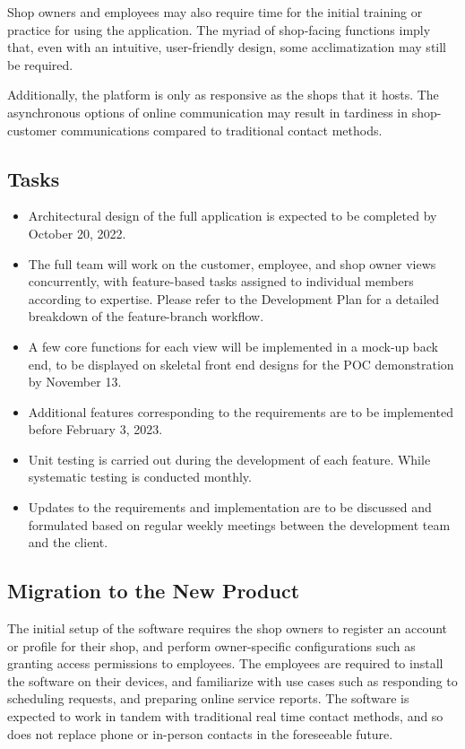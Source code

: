 \documentclass[12pt]{article}
\begin{document}
Shop owners and employees may also require time for the initial training or 
practice for using the application. The myriad of shop-facing functions imply 
that, even with an intuitive, user-friendly design, some acclimatization may 
still be required.

Additionally, the platform is only as responsive as the shops that it hosts. 
The asynchronous options of online communication may result in tardiness in 
shop-customer communications compared to traditional contact methods.



\subsection{Tasks}
\begin{itemize}
    \item Architectural design of the full application is expected to be 
    completed by October 20, 2022. 
    \item The full team will work on the customer, employee, and shop owner 
    views concurrently, with feature-based tasks assigned to individual members 
    according to expertise. Please refer to the Development Plan for a detailed 
    breakdown of the feature-branch workflow.
    \item A few core functions for each view will be implemented in a mock-up 
    back end, to be displayed on skeletal front end designs for the POC 
    demonstration by November 13.
    \item Additional features corresponding to the requirements are to be 
    implemented before February 3, 2023.
    \item Unit testing is carried out during the development of each feature. 
    While systematic testing is conducted monthly.
    \item Updates to the requirements and implementation are to be discussed 
    and formulated based on regular weekly meetings between the development 
    team and the client.
    
\end{itemize}

\subsection{Migration to the New Product}
The initial setup of the software requires the shop owners to register an 
account or profile for their shop, and perform owner-specific configurations 
such as granting access permissions to employees. The employees are required to 
install the software on their devices, and familiarize with use cases such as 
responding to scheduling requests, and preparing online service reports. The 
software is expected to work in tandem with traditional real time contact 
methods, and so does not replace phone or in-person contacts in the foreseeable 
future.
\end{document}
